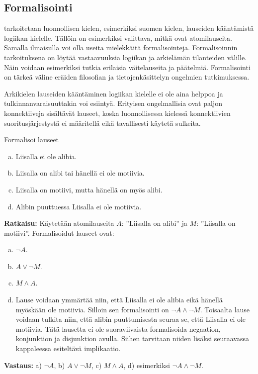 \subsection*{Formalisointi}
 tarkoitetaan luonnollisen kielen, esimerkiksi suomen kielen, lauseiden kääntämistä logiikan kielelle. Tällöin on esimerkiksi valittava, mitkä ovat atomilauseita. Samalla ilmaisulla voi olla useita mielekkäitä formalisointeja. Formalisoinnin tarkoituksena on löytää vastaavuuksia logiikan ja arkielämän tilanteiden välille. Näin voidaan esimerkiksi tutkia erilaisia väitelauseita ja päätelmiä. Formalisointi on tärkeä väline eräiden filosofian ja tietojenkäsittelyn ongelmien tutkimuksessa.

Arkikielen lauseiden kääntäminen logiikan kielelle ei ole aina helppoa ja tulkinnanvaraisuuttakin voi esiintyä. Erityisen ongelmallisia ovat paljon konnektiiveja sisältävät lauseet, koska luonnollisessa kielessä konnektiivien suoritusjärjestystä ei määritellä eikä tavallisesti käytetä sulkeita.

\begin{esimerkki}
Formalisoi lauseet
\begin{enumerate}[a)]
\item Liisalla ei ole alibia. 
\item Liisalla on alibi tai hänellä ei ole motiivia.
\item Liisalla on motiivi, mutta hänellä on myös alibi.
\item Alibin puuttuessa Liisalla ei ole motiivia. 
\end{enumerate}

{\bf Ratkaisu:}
Käytetään atomilauseita $A$: ''Liisalla on alibi'' ja $M$: ''Liisalla on motiivi''.	
Formalisoidut lauseet ovat:
\begin{enumerate}[a)]
\item $\lnot A$.
\item $A \lor \lnot M$.
\item $M\land A$.
\item Lause voidaan ymmärtää niin, että Liisalla ei ole alibia eikä hänellä myöskään ole motiivia. Silloin sen formalisointi on $\lnot A \land \lnot M$. Toisaalta lause voidaan tulkita niin, että alibin puuttumisesta seuraa se, että Liisalla ei ole motiivia. Tätä lausetta ei ole suoraviivaista formalisoida negaation, konjunktion ja disjunktion avulla. Siihen tarvitaan niiden lisäksi seuraavassa kappaleessa esiteltävä implikaatio. 
\end{enumerate}

{\bf Vastaus:}
a) $\lnot A$, b) $A \lor \lnot M$, c) $M\land A$, d) esimerkiksi 
$\lnot A \land \lnot M$.
\end{esimerkki}

